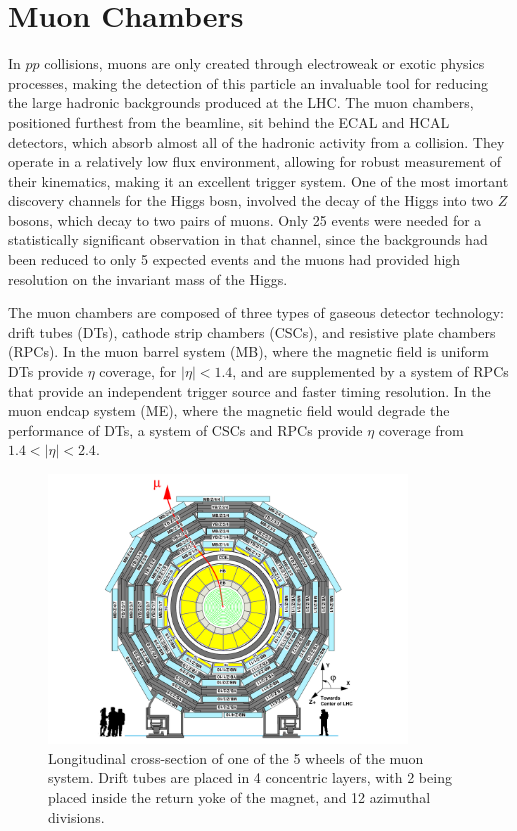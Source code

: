 \section{Muon Chambers}
\label{muon_chamber_description}

\par In $pp$ collisions, muons are only created through electroweak or
exotic physics processes, making the detection of this particle an
invaluable tool for reducing the large hadronic backgrounds produced
at the LHC.  The muon chambers, positioned furthest from the beamline,
sit behind the ECAL and HCAL detectors, which absorb almost all of the
hadronic activity from a collision.  They operate in a relatively low
flux environment, allowing for robust measurement of their
kinematics, making it an excellent trigger system.  One of the most
imortant discovery channels for the  Higgs bosn, involved the decay of
the Higgs into two $Z$ bosons, which decay to two pairs of muons.
Only 25 events were needed for a statistically significant observation
in that channel, since the backgrounds had been reduced to only 5
expected events and the muons had provided high resolution on the
invariant mass of the Higgs.   

\par The muon chambers are composed of three types of gaseous detector
technology: drift tubes (DTs), cathode strip chambers (CSCs), and
resistive plate chambers (RPCs).  In the muon barrel system (MB),
where the magnetic field is uniform DTs provide $\eta$ coverage, for
$|\eta|<1.4$, and are supplemented by a system of RPCs that provide an
independent trigger source and faster timing resolution.  In the muon
endcap system (ME), where the magnetic field would degrade the
performance of DTs, a system of CSCs and RPCs provide $\eta$ coverage
from $1.4<|\eta|<2.4$.  

\begin{figure}[h]
   \centering
  \includegraphics[width=0.85\textwidth]{Figures/CMS_Diagrams/Muon__DT_layout.pdf}
  \caption{Longitudinal cross-section of one of the 5 wheels of the
    muon system.  Drift tubes are placed in 4 concentric layers, with
    2 being placed inside the return yoke of the magnet, and 12
    azimuthal divisions.} \label{fig:muon_dt_layout}
\end{figure}

